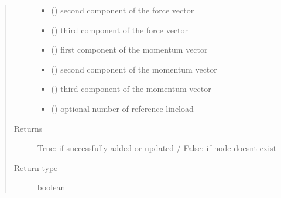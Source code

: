 \documentclass[letterpaper,10pt,english]{sphinxmanual}
\begin{document}
\begin{fulllineitems}
\begin{fulllineitems}
\begin{quote}
\begin{description}
\begin{itemize}
\item {} 
 () \textendash{} second component of the force vector

\item {} 
 () \textendash{} third component of the force vector

\item {} 
 () \textendash{} first component of the momentum vector

\item {} 
 () \textendash{} second component of the momentum vector

\item {} 
 () \textendash{} third component of the momentum vector

\item {} 
 () \textendash{} optional number of reference lineload

\end{itemize}

\item[{Returns}] \leavevmode
True: if successfully added or updated / False: if node doesnt exist

\item[{Return type}] \leavevmode
boolean

\end{description}\end{quote}

\end{fulllineitems}



\end{fulllineitems}
\end{document}

